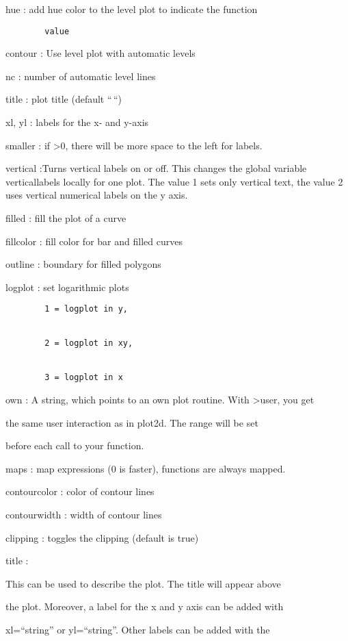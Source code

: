 \documentclass[
]{book}
\begin{document}
hue : add hue color to the level plot to indicate the function

\begin{verbatim}
        value
\end{verbatim}

contour : Use level plot with automatic levels

nc : number of automatic level lines

title : plot title (default ``\,``)

xl, yl : labels for the x- and y-axis

smaller : if \textgreater0, there will be more space to the left for labels.

vertical :Turns vertical labels on or off. This changes the global variable verticallabels locally for one plot. The value 1 sets only vertical text, the value 2 uses vertical numerical labels on the y axis.

filled : fill the plot of a curve

fillcolor : fill color for bar and filled curves

outline : boundary for filled polygons

logplot : set logarithmic plots

\begin{verbatim}
        1 = logplot in y,


        2 = logplot in xy,


        3 = logplot in x
\end{verbatim}

own : A string, which points to an own plot routine. With \textgreater user, you get

the same user interaction as in plot2d. The range will be set

before each call to your function.

maps : map expressions (0 is faster), functions are always mapped.

contourcolor : color of contour lines

contourwidth : width of contour lines

clipping : toggles the clipping (default is true)

title :

This can be used to describe the plot. The title will appear above

the plot. Moreover, a label for the x and y axis can be added with

xl=``string'' or yl=``string''. Other labels can be added with the
\end{document}
